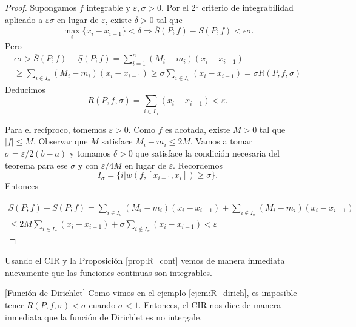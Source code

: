 \begin{proof} Supongamos $f$ integrable y $\varepsilon,\sigma>0$. Por el 2° criterio de integrabilidad aplicado a $ \varepsilon\sigma$ en lugar de $\varepsilon$, existe $\delta>0$ tal que 
\[\max_i\{x_i-x_{i-1}\}<\delta\Rightarrow 
 \overline{S}(P;f)-\underline{S}(P;f)<\epsilon\sigma.
\]
Pero 
\begin{multline*}\label{eq:3crite}
\epsilon\sigma> \overline{S}(P;f)-\underline{S}(P;f)= \sum_{i=1}^n (M_i-m_i)(x_i-x_{i-1})\\
\geq \sum_{i\in I_\sigma} (M_i-m_i)(x_i-x_{i-1})\geq \sigma \sum_{i\in I_\sigma} (x_i-x_{i-1})=\sigma R(P,f,\sigma)
\end{multline*}
Deducimos
\[
 R(P,f,\sigma)=\sum_{i\in I_{\sigma}}(x_i-x_{i-1})<\varepsilon.
\]

Para el recíproco, tomemos $\varepsilon>0$. Como $f$ es acotada, existe $M>0$ tal que $|f|\leq M$.  Observar que  $M$ satisface $M_i-m_i\leq 2M$. Vamos a tomar $\sigma=\varepsilon/2(b-a)$ y tomamos $\delta>0$ que satisface la condición necesaria del teorema para ese $\sigma$ y con $\varepsilon/4M$ en lugar de $\varepsilon$. Recordemos
\[
 I_\sigma=\{i \left| w(f,[x_{i-1},x_i])\geq \sigma\right.\}.
\]
Entonces 

\begin{multline*}\label{eq:3criteb}
 \overline{S}(P;f)-\underline{S}(P;f)= \sum_{i\in I_\sigma} (M_i-m_i)(x_i-x_{i-1})+\sum_{i\notin I_\sigma} (M_i-m_i)(x_i-x_{i-1})\\
 \leq 2M\sum_{i\in I_\sigma}  (x_i-x_{i-1})+ \sigma \sum_{i\notin I_\sigma}  (x_i-x_{i-1})<\varepsilon
\end{multline*}

 
\end{proof}

\begin{observa} Usando el CIR y la Proposición \ref{prop:R_cont} vemos de manera inmediata nuevamente que las funciones continuas son integrables. 
 
\end{observa}



\begin{ejemplo}{}[Función de Dirichlet] Como vimos en el ejemplo \ref{ejem:R_dirich},   es imposible tener $R(P,f,\sigma)<\sigma$  cuando $\sigma<1$. Entonces,  el CIR nos dice de manera inmediata que la función de Dirichlet es no intergale.  
 
\end{ejemplo}



